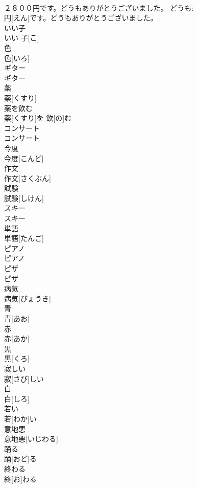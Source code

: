 \documentclass[8pt]{extreport}
\begin{document}
\begin{CJK}{UTF8}{min}
\\	２８００円です。どうもありがとうございました。	どうも: 
\\	円[えん]です。どうもありがとうございました。		
\\	いい子	
\\	いい 子[こ]		
\\	色	
\\	色[いろ]		
\\	ギター	
\\	ギター		
\\	薬	
\\	薬[くすり]		
\\	薬を飲む	
\\	薬[くすり]を 飲[の]む		
\\	コンサート	
\\	コンサート		
\\	今度	
\\	今度[こんど]		
\\	作文	
\\	作文[さくぶん]		
\\	試験	
\\	試験[しけん]		
\\	スキー	
\\	スキー		
\\	単語	
\\	単語[たんご]		
\\	ピアノ	
\\	ピアノ		
\\	ピザ	
\\	ピザ		
\\	病気	
\\	病気[びょうき]		
\\	青	
\\	青[あお]		
\\	赤	
\\	赤[あか]		
\\	黒	
\\	黒[くろ]		
\\	寂しい	
\\	寂[さび]しい		
\\	白	
\\	白[しろ]		
\\	若い	
\\	若[わか]い		
\\	意地悪	
\\	意地悪[いじわる]		
\\	踊る	
\\	踊[おど]る		
\\	終わる	
\\	終[お]わる		

\end{CJK}
\end{document}
